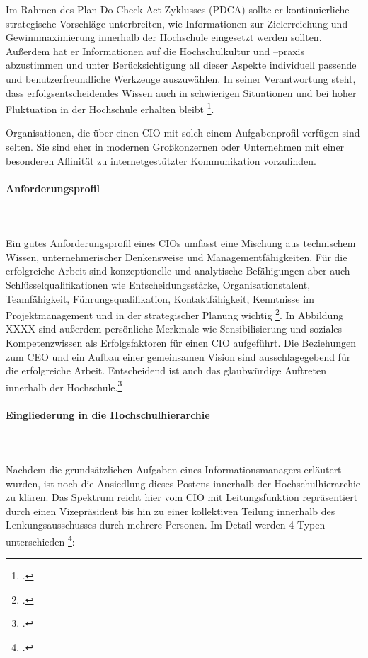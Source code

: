 Im Rahmen des Plan-Do-Check-Act-Zyklusses (PDCA) sollte er kontinuierliche strategische Vorschläge unterbreiten, wie Informationen zur Zielerreichung und Gewinnmaximierung innerhalb der Hochschule eingesetzt werden sollten. Außerdem hat er Informationen auf die Hochschulkultur und –praxis  abzustimmen und unter Berücksichtigung all dieser Aspekte individuell passende und benutzerfreundliche Werkzeuge auszuwählen. In seiner Verantwortung steht, dass erfolgsentscheidendes Wissen auch in schwierigen Situationen und bei hoher Fluktuation in der Hochschule erhalten bleibt \footcite{Zitat fehlt}.

Organisationen, die über einen CIO mit solch einem Aufgabenprofil verfügen sind selten. Sie sind eher in modernen Großkonzernen oder Unternehmen mit einer besonderen Affinität zu internetgestützter Kommunikation vorzufinden. 


\paragraph{Anforderungsprofil}\mbox{}\\\\
Ein gutes Anforderungsprofil eines CIOs umfasst eine Mischung aus technischem Wissen, unternehmerischer Denkensweise und Managementfähigkeiten. Für die erfolgreiche Arbeit sind konzeptionelle und analytische Befähigungen aber auch Schlüsselqualifikationen wie Entscheidungsstärke, Organisationstalent, Teamfähigkeit, Führungsqualifikation, Kontaktfähigkeit, Kenntnisse im Projektmanagement und  in der strategischer Planung wichtig \footcite{Zitat fehlt}. 
In Abbildung XXXX sind außerdem persönliche Merkmale wie Sensibilisierung und soziales Kompetenzwissen als Erfolgsfaktoren für einen CIO aufgeführt. Die Beziehungen zum CEO und ein Aufbau einer gemeinsamen Vision sind ausschlagegebend für die erfolgreiche Arbeit. Entscheidend ist auch das glaubwürdige Auftreten innerhalb der Hochschule.\footcite{Zitat fehlt}


\paragraph{Eingliederung in die Hochschulhierarchie}\mbox{}\\\\
Nachdem die grundsätzlichen Aufgaben eines Informationsmanagers erläutert wurden, ist noch die Ansiedlung dieses Postens innerhalb der Hochschulhierarchie zu klären. Das Spektrum reicht hier vom CIO mit Leitungsfunktion repräsentiert durch einen Vizepräsident bis hin zu einer kollektiven Teilung innerhalb des Lenkungsausschusses durch mehrere Personen. Im Detail werden 4 Typen unterschieden \footcite{Zitat fehlt}:

